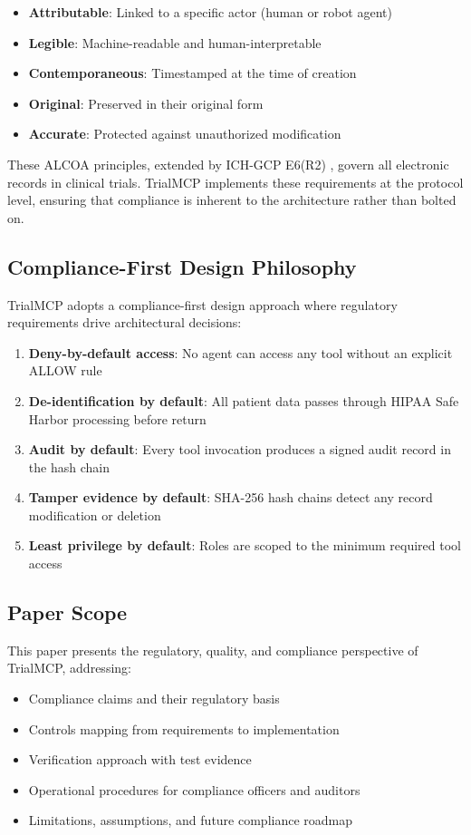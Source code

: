 \documentclass[10pt,letterpaper]{article}
\begin{document}
\begin{itemize}[leftmargin=2em]
    \item \textbf{Attributable}: Linked to a specific actor (human or robot agent)
    \item \textbf{Legible}: Machine-readable and human-interpretable
    \item \textbf{Contemporaneous}: Timestamped at the time of creation
    \item \textbf{Original}: Preserved in their original form
    \item \textbf{Accurate}: Protected against unauthorized modification
\end{itemize}

These ALCOA principles, extended by ICH-GCP E6(R2) \cite{ichgcp2016}, govern all electronic records in clinical trials. TrialMCP implements these requirements at the protocol level, ensuring that compliance is inherent to the architecture rather than bolted on.

\subsection{Compliance-First Design Philosophy}

TrialMCP adopts a compliance-first design approach where regulatory requirements drive architectural decisions:

\begin{enumerate}[leftmargin=2em]
    \item \textbf{Deny-by-default access}: No agent can access any tool without an explicit ALLOW rule
    \item \textbf{De-identification by default}: All patient data passes through HIPAA Safe Harbor processing before return
    \item \textbf{Audit by default}: Every tool invocation produces a signed audit record in the hash chain
    \item \textbf{Tamper evidence by default}: SHA-256 hash chains detect any record modification or deletion
    \item \textbf{Least privilege by default}: Roles are scoped to the minimum required tool access
\end{enumerate}

\subsection{Paper Scope}

This paper presents the regulatory, quality, and compliance perspective of TrialMCP, addressing:
\begin{itemize}[leftmargin=2em]
    \item Compliance claims and their regulatory basis
    \item Controls mapping from requirements to implementation
    \item Verification approach with test evidence
    \item Operational procedures for compliance officers and auditors
    \item Limitations, assumptions, and future compliance roadmap
\end{itemize}
\end{document}
